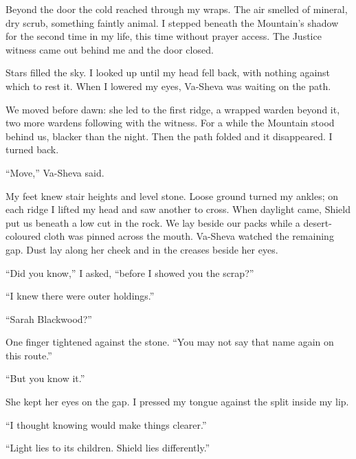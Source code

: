 \ornament

Beyond the door the cold reached through my wraps. The air smelled of mineral, dry scrub, something faintly animal. I stepped beneath the Mountain's shadow for the second time in my life, this time without prayer access. The Justice witness came out behind me and the door closed.\par

Stars filled the sky. I looked up until my head fell back, with nothing against which to rest it. When I lowered my eyes, Va-Sheva was waiting on the path.\par

We moved before dawn: she led to the first ridge, a wrapped warden beyond it, two more wardens following with the witness. For a while the Mountain stood behind us, blacker than the night. Then the path folded and it disappeared. I turned back.\par

``Move,'' Va-Sheva said.\par

My feet knew stair heights and level stone. Loose ground turned my ankles; on each ridge I lifted my head and saw another to cross. When daylight came, Shield put us beneath a low cut in the rock. We lay beside our packs while a desert-coloured cloth was pinned across the mouth. Va-Sheva watched the remaining gap. Dust lay along her cheek and in the creases beside her eyes.\par

``Did you know,'' I asked, ``before I showed you the scrap?''\par

``I knew there were outer holdings.''\par

``Sarah Blackwood?''\par

One finger tightened against the stone. ``You may not say that name again on this route.''\par

``But you know it.''\par

She kept her eyes on the gap. I pressed my tongue against the split inside my lip.\par

``I thought knowing would make things clearer.''\par

``Light lies to its children. Shield lies differently.''\par


